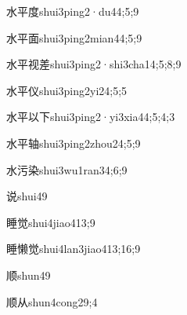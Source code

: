 \begin{verbete}{水平度}{shui3ping2·du4}{4;5;9}
\end{verbete}

\begin{verbete}{水平面}{shui3ping2mian4}{4;5;9}
\end{verbete}

\begin{verbete}{水平视差}{shui3ping2·shi3cha1}{4;5;8;9}
\end{verbete}

\begin{verbete}{水平仪}{shui3ping2yi2}{4;5;5}
\end{verbete}

\begin{verbete}{水平以下}{shui3ping2·yi3xia4}{4;5;4;3}
\end{verbete}

\begin{verbete}{水平轴}{shui3ping2zhou2}{4;5;9}
\end{verbete}

\begin{verbete}{水污染}{shui3wu1ran3}{4;6;9}
\end{verbete}

\begin{verbete}{说}{shui4}{9}
\end{verbete}

\begin{verbete}{睡觉}{shui4jiao4}{13;9}
\end{verbete}

\begin{verbete}{睡懒觉}{shui4lan3jiao4}{13;16;9}
\end{verbete}

\begin{verbete}{顺}{shun4}{9}
\end{verbete}

\begin{verbete}{顺从}{shun4cong2}{9;4}
\end{verbete}

